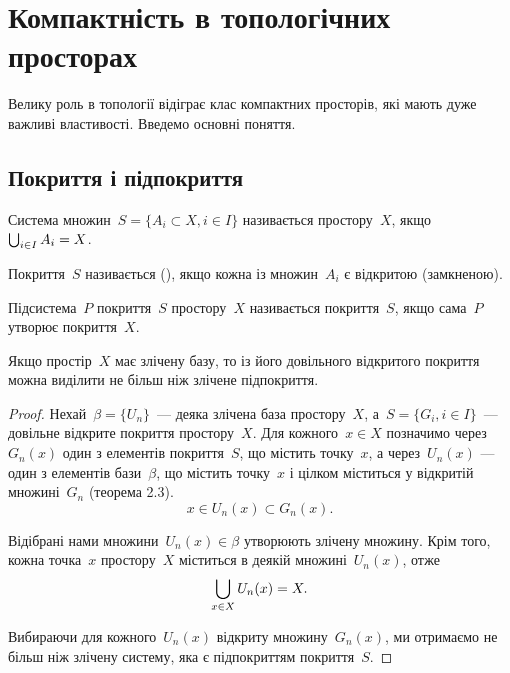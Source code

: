 \chapter{Компактність в топологічних просторах}

Велику роль в топології відіграє клас компактних просторів, які мають дуже важливі властивості. Введемо основні поняття.

\section{Покриття і підпокриття}

\begin{definition}
    Система множин~$S = \{A_i \subset X, i \in I\}$ називається  простору~$X$, якщо~$\operatorname*{\bigcup}_{i \in I} A_i = X$.
\end{definition}

\begin{definition}
    Покриття~$S$ називається  (), якщо кожна із множин~$A_i$ є відкритою (замкненою).
\end{definition}

\begin{definition}
    Підсистема~$P$ покриття~$S$ простору~$X$ називається  покриття~$S$, якщо сама~$P$ утворює покриття~$X$.
\end{definition}

\begin{theorem}[Ліндельоф]
    Якщо простір~$X$ має злічену базу, то із його довільного відкритого покриття можна виділити не більш ніж злічене підпокриття.
\end{theorem}

\begin{proof}
    Нехай~$\beta = \{U_n\}$~--- деяка злічена база простору~$X$, а~$S = \{G_i, i \in I\}$~--- довільне відкрите покриття простору~$X$. Для кожного~$x \in X$ позначимо через~$G_n(x)$ один з елементів покриття~$S$, що містить точку~$x$, а через~$U_n(x)$ --- один з елементів бази~$\beta$, що містить точку~$x$ і цілком міститься у відкритій множині~$G_n$ (\error теорема 2.3). 
    \begin{equation*}
    x \in U_n(x) \subset G_n(x).
    \end{equation*}

    Відібрані нами множини~$U_n(x) \in \beta$ утворюють злічену множину. Крім того, кожна точка~$x$ простору~$X$ міститься в деякій множині~$U_n(x)$, отже
    \begin{equation*}
        \operatorname*{\bigcup}_{x \in X} U_n(x) = X.
    \end{equation*}

    Вибираючи для кожного~$U_n(x)$ відкриту множину~$G_n(x)$, ми отримаємо не більш ніж злічену систему, яка є підпокриттям покриття~$S$.
\end{proof}

